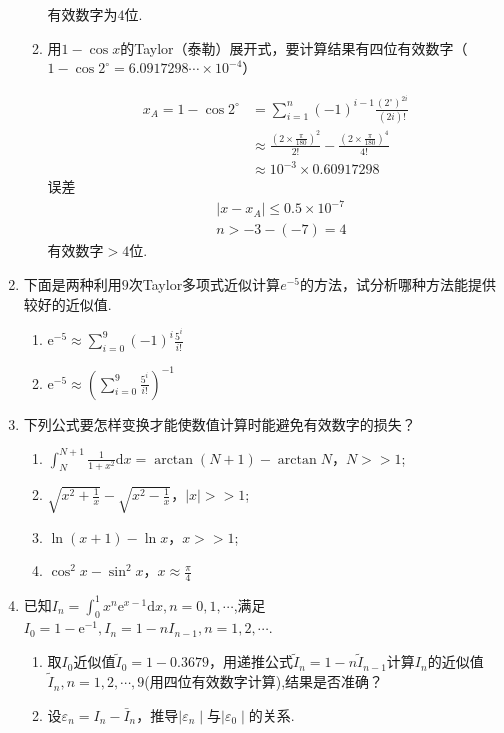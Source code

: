 \documentclass[a4paper]{article}
\begin{document}
\begin{enumerate}
\begin{enumerate}[label=（\arabic*）]
\begin{solution}
      有效数字为$4$位.
    \end{solution} 
    \item 用$1-\cos x$的Taylor（泰勒）展开式，要计算结果有四位有效数字（$1-\cos 2^\circ =6.0917298\cdots \times 10^{-4}$）
    \begin{solution}
      \begin{align*}
        x_A=1 - \cos 2^\circ &= \sum_{i=1}^n (-1)^{i-1}\frac{(2^\circ)^{2i}}{(2i)!}\\
        &\approx \frac{(2\times\frac{\pi}{180})^2}{2!}-\frac{(2\times\frac{\pi}{180})^4}{4!}\\
        &\approx 10^{-3}\times0.60917298
      \end{align*}
      误差
      \begin{align*}
        &\left |  x-x_A\right | \le 0.5\times10^{-7}\\
        &n>-3-(-7)=4
      \end{align*}
      有效数字$>4$位.
    \end{solution}
  \end{enumerate}
  

  \item 下面是两种利用$9$次Taylor多项式近似计算$e^{-5}$的方法，试分析哪种方法能提供较好的近似值.
  \begin{enumerate}[label=（\arabic*）]
    \item $\mathrm{e}^{-5}\approx\sum_{i=0}^9\left(-1\right)^i\frac{5^i}{i!}$
    \item $\mathrm{e}^{-5}\approx\left(\sum_{i=0}^9\frac{5^i}{i!}\right)^{-1}$
  \end{enumerate}

  \item 下列公式要怎样变换才能使数值计算时能避免有效数字的损失？
  \begin{enumerate}[label=（\arabic*）]
    \item $\int_N^{N+1}\frac{1}{1+x^2}\mathrm{d}x=\arctan(N+1)-\arctan N$，$N>>1$;
    \item $\sqrt{x^2+\frac{1}{x}}-\sqrt{x^2-\frac{1}{x}}$，$|x|>>1$;
    \item $\ln(x+1)-\ln x$，$x>>1$;
    \item $\cos^2x-\sin^2x$，$x\approx\frac{\pi}{4}$
  \end{enumerate}

  \item 已知$I_n=\int_0^1x^n\mathrm{e}^{x-1}\mathrm{d}x,n=0,1,\cdots$,满足$I_0=1-\mathrm{e}^{-1},I_n=1-nI_{n-1},n=1,2,\cdots$.
  \begin{enumerate}[label=（\arabic*）]
    \item 取$I_0$近似值$\tilde{I}_{0}=1-0.3679$，用递推公式$\tilde{I}_{n}=1-n\tilde{I}_{n-1}$计算$I_n$的近似值$\tilde{I}_n,n=1,2,\cdots ,9$(用四位有效数字计算),结果是否准确？
    \item 设$\varepsilon_n=I_n-\bar{I}_n$，推导$\mid\varepsilon_n\mid$与$\mid\varepsilon_0\mid$的关系.
  \end{enumerate}

\end{enumerate}
\end{document}

